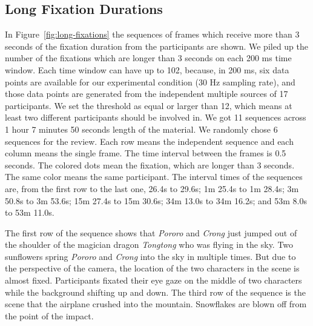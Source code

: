 \documentclass[10pt,letterpaper]{article}
\begin{document}
\subsection{Long Fixation Durations}

In Figure~\ref{fig:long-fixations} the sequences of frames which receive more than 3 seconds of the fixation duration from the participants are shown. We piled up the number of the fixations which are longer than 3 seconds on each 200 ms time window. Each time window can have up to 102, because, in 200 ms, six data points are available for our experimental condition (30 Hz sampling rate), and those data points are generated from the independent multiple sources of 17 participants. We set the threshold as equal or larger than 12, which means at least two different participants should be involved in. We got 11 sequences across 1 hour 7 minutes 50 seconds length of the material. We randomly chose 6 sequences for the review. Each row means the independent sequence and each column means the single frame. The time interval between the frames is 0.5 seconds. The colored dots mean the fixation, which are longer than 3 seconds. The same color means the same participant. The interval times of the sequences are, from the first row to the last one, 26.4s to 29.6s; 1m 25.4s to 1m 28.4s; 3m 50.8s to 3m 53.6s; 15m 27.4s to 15m 30.6s; 34m 13.0s to 34m 16.2s; and 53m 8.0s to 53m 11.0s.

The first row of the sequence shows that \textit{Pororo} and \textit{Crong} just jumped out of the shoulder of the magician dragon \textit{Tongtong} who was flying in the sky. Two sunflowers spring \textit{Pororo} and \textit{Crong} into the sky in multiple times. But due to the perspective of the camera, the location of the two characters in the scene is almost fixed. Participants fixated their eye gaze on the middle of two characters while the background shifting up and down. The third row of the sequence is the scene that the airplane crushed into the mountain. Snowflakes are blown off from the point of the impact.
\end{document}
